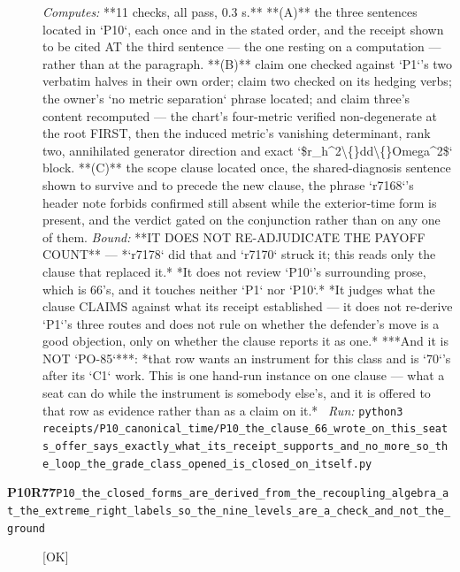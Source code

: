 \begin{description}
\emph{Computes:} **11 checks, all pass, 0.3 s.** **(A)** the three sentences located in `P10`, each once and in the stated order, and the receipt shown to be cited AT the third sentence --- the one resting on a computation --- rather than at the paragraph. **(B)** claim one checked against `P1`'s two verbatim halves in their own order; claim two checked on its hedging verbs; the owner's `no metric separation` phrase located; and claim three's content recomputed --- the chart's four-metric verified non-degenerate at the root FIRST, then the induced metric's vanishing determinant, rank two, annihilated generator direction and exact `\$r\_h\textasciicircum{}2\textbackslash\{\}dd\textbackslash\{\}Omega\textasciicircum{}2\$` block. **(C)** the scope clause located once, the shared-diagnosis sentence shown to survive and to precede the new clause, the phrase `r7168`'s header note forbids confirmed still absent while the exterior-time form is present, and the verdict gated on the conjunction rather than on any one of them.
 \emph{Bound:}  **IT DOES NOT RE-ADJUDICATE THE PAYOFF COUNT** --- *`r7178` did that and `r7170` struck it; this reads only the clause that replaced it.*  *It does not review `P10`'s surrounding prose, which is 66's, and it touches neither `P1` nor `P10`.*  *It judges what the clause CLAIMS against what its receipt established --- it does not re-derive `P1`'s three routes and does not rule on whether the defender's move is a good objection, only on whether the clause reports it as one.*  ***And it is NOT `PO-85`***: *that row wants an instrument for this class and is `70`'s after its `C1` work. This is one hand-run instance on one clause --- what a seat can do while the instrument is somebody else's, and it is offered to that row as evidence rather than as a claim on it.*
\ \emph{Run:} \texttt{python3 receipts/P10\_canonical\_time/P10\_the\_clause\_66\_wrote\_on\_this\_seats\_offer\_says\_exactly\_what\_its\_receipt\_supports\_and\_no\_more\_so\_the\_loop\_the\_grade\_class\_opened\_is\_closed\_on\_itself.py}
\item[\rcptlabel{P10_the_closed_forms_are_derived_from_the_recoupling_algebra_at_the_extreme_right_labels_so_the_nine_levels_are_a_check_and_not_the_ground}{P10R77}\textbf{P10R77}\quad\texttt{P10\_the\_closed\_forms\_are\_derived\_from\_the\_recoupling\_algebra\_at\_the\_extreme\_right\_labels\_so\_the\_nine\_levels\_are\_a\_check\_and\_not\_the\_ground}]\hfill\textsf{[OK]}\\

\end{description}
